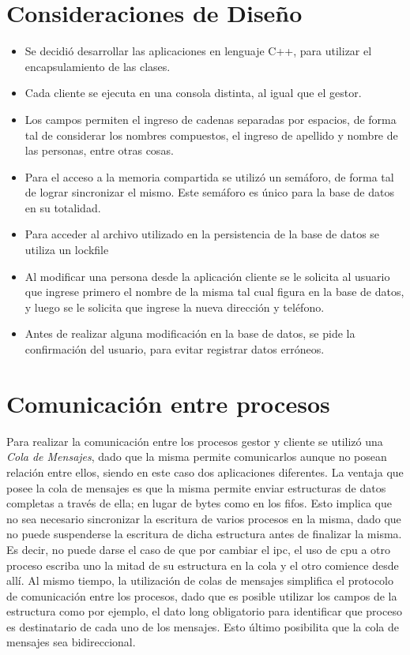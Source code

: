 \documentclass[11pt]{article}
\begin{document}
\section{Consideraciones de Dise\~no}

\begin{itemize}
\item Se decidió desarrollar las aplicaciones en lenguaje C++, para utilizar el encapsulamiento de las clases.
\item Cada cliente se ejecuta en una consola distinta, al igual que el gestor.
\item Los campos permiten el ingreso de cadenas separadas por espacios, de forma tal de considerar los nombres compuestos, el ingreso de apellido y 
nombre de las personas, entre otras cosas.
\item Para el acceso a la memoria compartida se utiliz\'o un sem\'aforo, de forma tal de lograr sincronizar el mismo. Este sem\'aforo es \'unico 
para la base de datos en su totalidad.
\item Para acceder al archivo utilizado en la persistencia de la base de datos se utiliza un lockfile 
\item Al modificar una persona desde la aplicaci\'on cliente se le solicita al usuario que ingrese primero el nombre de la misma tal cual figura en la base de datos, 
y luego se le solicita que ingrese la nueva direcci\'on y tel\'efono. 
\item Antes de realizar alguna modificación en la base de datos, se pide la confirmación del usuario, para evitar registrar datos erróneos.
\end{itemize}


\section {Comunicaci\'on entre procesos}

Para realizar la comunicaci\'on entre los procesos gestor y cliente se utiliz\'o una \textit{Cola de Mensajes}, dado que la misma permite comunicarlos 
aunque no posean relaci\'on entre ellos, siendo en este caso dos aplicaciones diferentes. La ventaja que posee la 
cola de mensajes es que la misma permite enviar estructuras de datos completas a trav\'es de ella; en lugar de bytes como en los fifos.
Esto implica que no sea necesario sincronizar la escritura de varios procesos en la misma, dado que no puede suspenderse la escritura 
de dicha estructura antes de finalizar la misma. Es decir, no puede darse el caso de que por cambiar el ipc, el uso de cpu a otro proceso escriba uno la mitad de su estructura 
en la cola y el otro comience desde allí.
Al mismo tiempo, la utilizaci\'on de colas de mensajes simplifica el protocolo de comunicaci\'on entre los procesos, dado que es posible utilizar los campos de la estructura 
como por ejemplo, el dato long obligatorio para identificar que proceso es destinatario de cada uno de los mensajes. Esto último posibilita que la cola de mensajes sea bidireccional.
\end{document}
